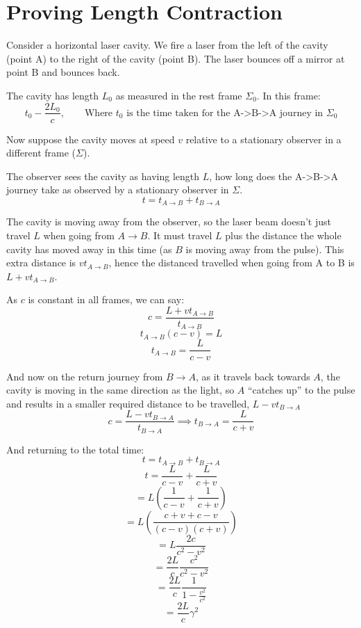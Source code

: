 \section{Proving Length Contraction}

Consider a horizontal laser cavity. We fire a laser from the left of the cavity (point A) to the right of the cavity (point B). The laser bounces off a mirror at point B and bounces back.

The cavity has length $L_0$ as measured in the rest frame $\Sigma_0$. In this frame:
\[
    t_0 - \frac{2L_0}{c}, \qquad \text{Where $t_0$ is the time taken for the A->B->A journey in $\Sigma_0$}
\]

Now suppose the cavity moves at speed $v$ relative to a stationary observer in a different frame ($\Sigma$).

The observer sees the cavity as having length $L$, how long does the A->B->A journey take as observed by a stationary observer in $\Sigma$.
\[
    t = t_{A \to B} + t_{B \to A}
\]

The cavity is moving away from the observer, so the laser beam doesn't just travel $L$ when going from $A \to B$. It must travel $L$ plus the distance the whole cavity has moved away in this time (as $B$ is moving away from the pulse). This extra distance is $vt_{A \to B}$, hence the distanced travelled when going from A to B is $L+ vt_{A \to B}$.

As $c$ is constant in all frames, we can say:
\[
    c = \frac{L + vt_{A \to B}}{t_{A \to B}}
\]
\[
    t_{A \to B} (c - v) = L
\]
\[
    t_{A \to B} = \frac{L}{c - v}
\]

And now on the return journey from $B \to A$, as it travels back towards $A$, the cavity is moving in the same direction as the light, so $A$ ``catches up'' to the pulse and results in a smaller required distance to be travelled, $L - vt_{B \to A}$
\[
    c = \frac{L - vt_{B \to A}}{t_{B \to A}} \implies t_{B \to A} = \frac{L}{c+v} 
\]

And returning to the total time:
\[
    t = t_{A \to B} + t_{B \to A}
\]
\[
    t = \frac{L}{c - v} + \frac{L}{c + v}
\]
\[
    = L \left(\frac{1}{c - v} + \frac{1}{c + v}\right)
\]
\[
    = L \left(\frac{c + v + c - v}{(c-v)(c+v)}\right)
\]
\[
    = L \frac{2c}{c^2 - v^2}
\]
\[
    = \frac{2L}{c} \frac{c^2}{c^2 - v^2}
\]
\[
    = \frac{2L}{c} \frac{1}{1 - \frac{v^2}{c^2}}
\]
\[
    = \frac{2L}{c} \gamma^2
\]

